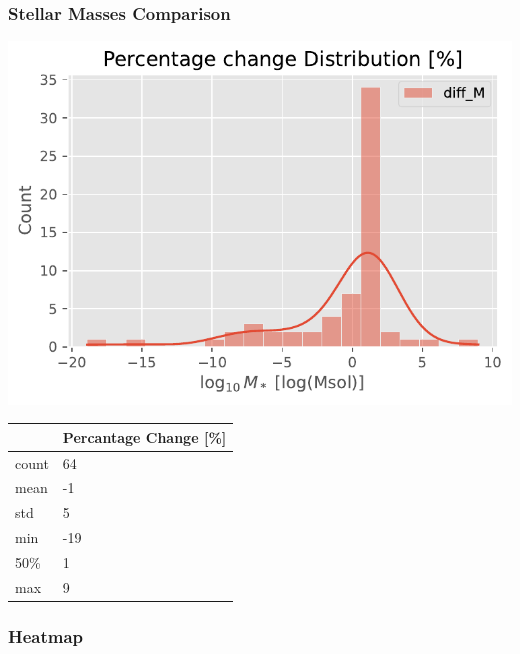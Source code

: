 \documentclass[
]{article}
\begin{document}
\subsubsection{Stellar Masses Comparison}

\includegraphics{compare_files/figure-pdf/cell-45-output-1.pdf}

\begin{longtable}[]{@{}ll@{}}
\toprule\noalign{}
& Percantage Change {[}\%{]} \\
\midrule\noalign{}
\endhead
\bottomrule\noalign{}
\endlastfoot
count & 64 \\
mean & -1 \\
std & 5 \\
min & -19 \\
50\% & 1 \\
max & 9 \\
\end{longtable}

\subsubsection{Heatmap}
\end{document}
